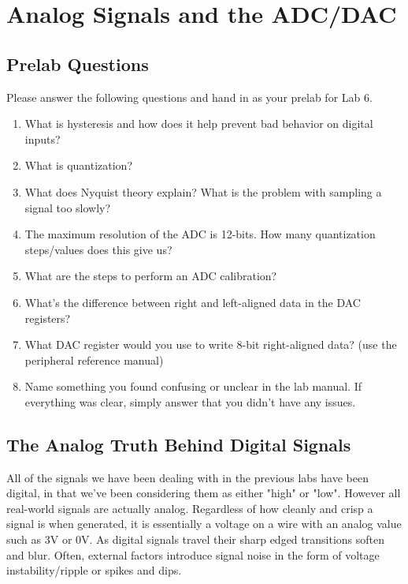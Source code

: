 \documentclass[openany,11pt,fleqn]{book} %
\begin{document}
	
\chapter{Analog Signals and the ADC/DAC}

\section{\color{blue}Prelab Questions}
\begin{question}[Prelab 6]
	Please answer the following questions and hand in as your prelab for Lab 6.
	\begin{enumerate}
		\item What is hysteresis and how does it help prevent bad behavior on digital inputs?
		\item What is quantization?
		\item What does Nyquist theory explain? What is the problem with sampling a signal too slowly?
		\item The maximum resolution of the ADC is 12-bits. How many quantization steps/values does this give us?
		\item What are the steps to perform an ADC calibration?
		\item What's the difference between right and left-aligned data in the DAC registers?
		\item What DAC register would you use to write 8-bit right-aligned data? (use the peripheral reference manual)
		\item Name something you found confusing or unclear in the lab manual. If everything was clear, simply answer that you didn't have any issues.		
	\end{enumerate}
\end{question}


\section{\color{orange}The Analog Truth Behind Digital Signals}
All of the signals we have been dealing with in the previous labs have been digital, in that we've been considering them as either "high" or "low". However all real-world signals are actually analog. Regardless of how cleanly and crisp a signal is when generated, it is essentially a voltage on a wire with an analog value such as 3V or 0V. As digital signals travel their sharp edged transitions soften and blur. Often, external factors introduce signal noise in the form of voltage instability/ripple or spikes and dips.
\end{document}
